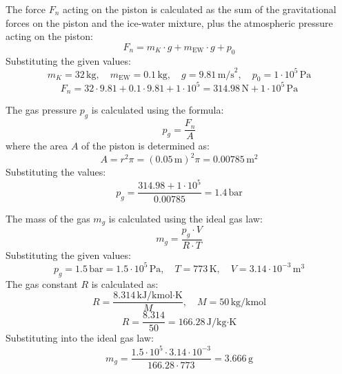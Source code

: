 The force \( F_n \) acting on the piston is calculated as the sum of the gravitational forces on the piston and the ice-water mixture, plus the atmospheric pressure acting on the piston:  
\[
F_n = m_K \cdot g + m_{\text{EW}} \cdot g + p_0
\]  
Substituting the given values:  
\[
m_K = 32 \, \text{kg}, \quad m_{\text{EW}} = 0.1 \, \text{kg}, \quad g = 9.81 \, \text{m/s}^2, \quad p_0 = 1 \cdot 10^5 \, \text{Pa}
\]  
\[
F_n = 32 \cdot 9.81 + 0.1 \cdot 9.81 + 1 \cdot 10^5 = 314.98 \, \text{N} + 1 \cdot 10^5 \, \text{Pa}
\]  

The gas pressure \( p_g \) is calculated using the formula:  
\[
p_g = \frac{F_n}{A}
\]  
where the area \( A \) of the piston is determined as:  
\[
A = r^2 \pi = (0.05 \, \text{m})^2 \pi = 0.00785 \, \text{m}^2
\]  
Substituting the values:  
\[
p_g = \frac{314.98 + 1 \cdot 10^5}{0.00785} = 1.4 \, \text{bar}
\]  

The mass of the gas \( m_g \) is calculated using the ideal gas law:  
\[
m_g = \frac{p_g \cdot V}{R \cdot T}
\]  
Substituting the given values:  
\[
p_g = 1.5 \, \text{bar} = 1.5 \cdot 10^5 \, \text{Pa}, \quad T = 773 \, \text{K}, \quad V = 3.14 \cdot 10^{-3} \, \text{m}^3
\]  
The gas constant \( R \) is calculated as:  
\[
R = \frac{8.314 \, \text{kJ/kmol·K}}{M}, \quad M = 50 \, \text{kg/kmol}
\]  
\[
R = \frac{8.314}{50} = 166.28 \, \text{J/kg·K}
\]  
Substituting into the ideal gas law:  
\[
m_g = \frac{1.5 \cdot 10^5 \cdot 3.14 \cdot 10^{-3}}{166.28 \cdot 773} = 3.666 \, \text{g}
\]